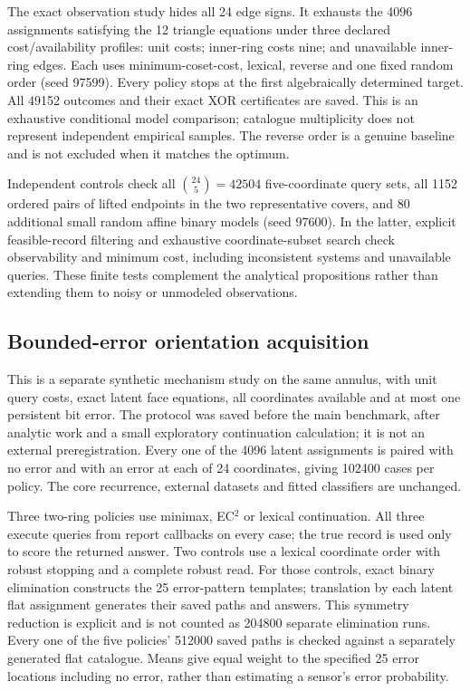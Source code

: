 \documentclass[11pt,a4paper]{article}
\theoremstyle{definition}\newtheorem{definition}[theorem]{Definition}
\begin{document}
The exact observation study hides all 24 edge signs. It exhausts the 4096 assignments satisfying the 12 triangle equations under three declared cost/availability profiles: unit costs; inner-ring costs nine; and unavailable inner-ring edges. Each uses minimum-coset-cost, lexical, reverse and one fixed random order (seed 97599). Every policy stops at the first algebraically determined target. All 49152 outcomes and their exact XOR certificates are saved. This is an exhaustive conditional model comparison; catalogue multiplicity does not represent independent empirical samples. The reverse order is a genuine baseline and is not excluded when it matches the optimum.

Independent controls check all $\binom{24}{5}=42504$ five-coordinate query sets, all 1152 ordered pairs of lifted endpoints in the two representative covers, and 80 additional small random affine binary models (seed 97600). In the latter, explicit feasible-record filtering and exhaustive coordinate-subset search check observability and minimum cost, including inconsistent systems and unavailable queries. These finite tests complement the analytical propositions rather than extending them to noisy or unmodeled observations.

\subsection{Bounded-error orientation acquisition}\label{sec:robustprotocol}
This is a separate synthetic mechanism study on the same annulus, with unit query costs, exact latent face equations, all coordinates available and at most one persistent bit error. The protocol was saved before the main benchmark, after analytic work and a small exploratory continuation calculation; it is not an external preregistration. Every one of the 4096 latent assignments is paired with no error and with an error at each of 24 coordinates, giving 102400 cases per policy. The core recurrence, external datasets and fitted classifiers are unchanged.

Three two-ring policies use minimax, EC$^2$ or lexical continuation. All three execute queries from report callbacks on every case; the true record is used only to score the returned answer. Two controls use a lexical coordinate order with robust stopping and a complete robust read. For those controls, exact binary elimination constructs the 25 error-pattern templates; translation by each latent flat assignment generates their saved paths and answers. This symmetry reduction is explicit and is not counted as 204800 separate elimination runs. Every one of the five policies' 512000 saved paths is checked against a separately generated flat catalogue. Means give equal weight to the specified 25 error locations including no error, rather than estimating a sensor's error probability.
\end{document}
